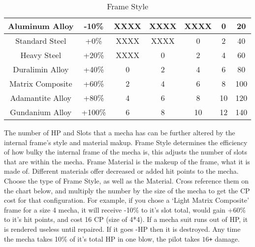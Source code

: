 \documentclass[twoside]{book}
\begin{document}
\begin{enumerate}
\begin{table}[htb]
\begin{center}
\begin{tabular}{|c|c|c|c|c|c|c|}
\hline

 Aluminum Alloy & -10\% & XXXX & XXXX & XXXX & 0 & 20 \\

\hline

 Standard Steel & +0\% & XXXX & XXXX & 0 & 2 & 40 \\

\hline

 Heavy Steel & +20\% & XXXX & 0 & 2 & 4 & 60 \\

\hline

 Duralimin Alloy & +40\% & 0 & 2 & 4 & 6 & 80 \\

\hline

 Matrix Composite & +60\% & 2 & 4 & 6 & 8 & 100 \\

\hline

 Adamantite Alloy & +80\% & 4 & 6 & 8 & 10 & 120 \\

\hline

 Gundanium Alloy & +100\% & 6 & 8 & 10 & 12 & 140 \\

\hline


  \end{tabular}
  
\caption{Frame Style}
  
  \end{center}
\end{table}
    
                    The number of HP and Slots that a mecha has can
                   be further altered by the internal frame's style
                   and material makup. Frame Style determines the
                   efficiency of how bulky the internal frame of the
                   mecha is, this adjusts the number of slots that are
                   within the mecha. Frame Material is the makeup of the
                   frame, what it is made of. Different materials offer
                   decreased or added hit points to the mecha. Choose the
                   type of Frame Style, as well as the Material. Cross
                   reference them on the chart below, and multiply the
                   number by the size of the mecha to get the CP cost for
                   that configuration. 
                    For example, if you chose a `Light Matrix
                   Composite' frame for a size 4 mecha, it will
                   receive -10\% to it's slot total, would gain +60\%
                   to it's hit points, and cost 16 CP (size of
                   4*4). 
                    If a mecha suit runs out of HP, it is rendered
                   useless until repaired. If it goes -HP then it is
                   destroyed. Any time the mecha takes 10\% of it's
                   total HP in one blow, the pilot takes \ensuremath{1}\ensuremath{6}\texttt{+} damage.
                   

\end{enumerate}
\end{document}
